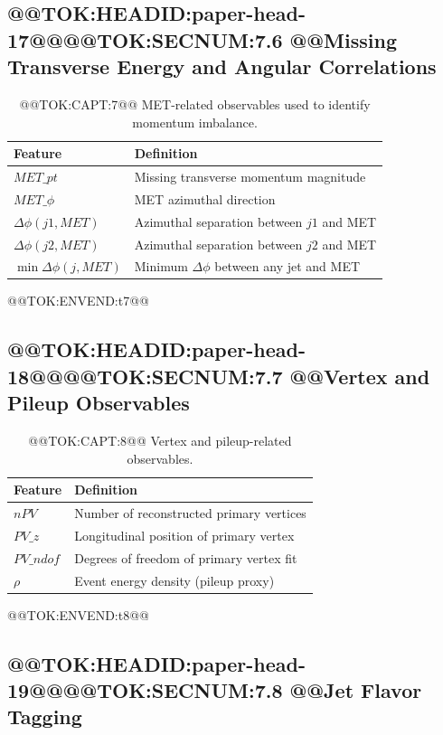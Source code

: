 \documentclass[11pt]{article}
\begin{document}
\subsection{@@TOK:HEADID:paper-head-17@@@@TOK:SECNUM:7.6 @@Missing Transverse Energy and Angular Correlations}

\begin{table}[h]
\centering
\caption{@@TOK:CAPT:7@@ MET-related observables used to identify momentum imbalance.}
\footnotesize

\begin{tabular}{ll}
\toprule
Feature & Definition \\
\midrule
$MET\_pt$ & Missing transverse momentum magnitude \\
$MET\_\phi$ & MET azimuthal direction \\
$\Delta\phi(j1, MET)$ & Azimuthal separation between $j1$ and MET \\
$\Delta\phi(j2, MET)$ & Azimuthal separation between $j2$ and MET \\
$\min\Delta\phi(j, MET)$ & Minimum $\Delta\phi$ between any jet and MET \\
\bottomrule
\end{tabular}

@@TOK:ENVEND:t7@@\end{table}

\subsection{@@TOK:HEADID:paper-head-18@@@@TOK:SECNUM:7.7 @@Vertex and Pileup Observables}

\begin{table}[H]
\centering
\caption{@@TOK:CAPT:8@@ Vertex and pileup-related observables.}
\footnotesize

\begin{tabular}{ll}
\toprule
Feature & Definition \\
\midrule
$nPV$ & Number of reconstructed primary vertices \\
$PV\_z$ & Longitudinal position of primary vertex \\
$PV\_ndof$ & Degrees of freedom of primary vertex fit \\
$\rho$ & Event energy density (pileup proxy) \\
\bottomrule
\end{tabular}

@@TOK:ENVEND:t8@@\end{table}

\subsection{@@TOK:HEADID:paper-head-19@@@@TOK:SECNUM:7.8 @@Jet Flavor Tagging}
\end{document}
